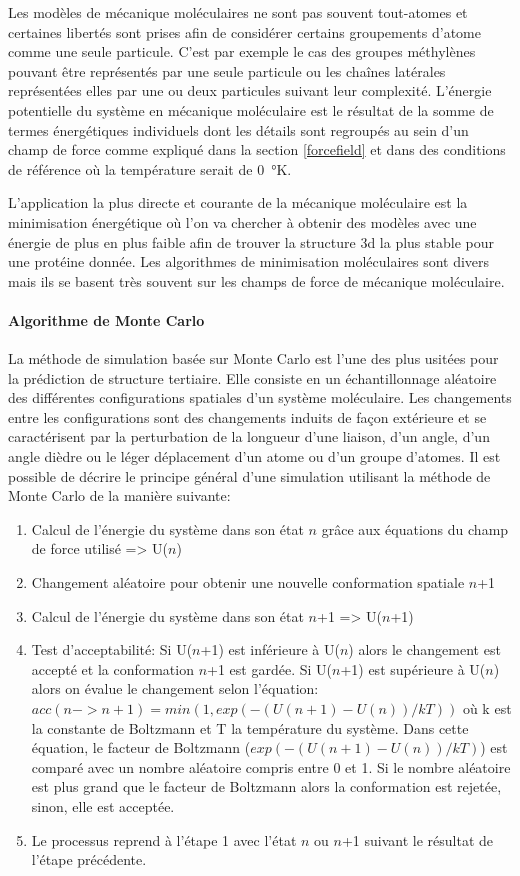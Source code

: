Les modèles de mécanique moléculaires ne sont pas souvent tout-atomes et certaines libertés sont prises afin de considérer certains groupements d'atome comme une seule particule. C'est par exemple le cas des groupes méthylènes pouvant être représentés par une seule particule ou les chaînes latérales représentées elles par une ou deux particules suivant leur complexité. L'énergie potentielle du système en mécanique moléculaire est le résultat de la somme de termes énergétiques individuels dont les détails sont regroupés au sein d'un champ de force comme expliqué dans la section \ref{forcefield} et dans des conditions de référence où la température serait de \SI{0}{\degree}K.

L'application la plus directe et courante de la mécanique moléculaire est la minimisation énergétique où l'on va chercher à obtenir des modèles avec une énergie de plus en plus faible afin de trouver la structure 3d la plus stable pour une protéine donnée. Les algorithmes de minimisation moléculaires sont divers mais ils se basent très souvent sur les champs de force de mécanique moléculaire.


\paragraph{Algorithme de Monte Carlo}

La méthode de simulation basée sur Monte Carlo est l'une des plus usitées \cite{metropolis1949monte} pour la prédiction de structure tertiaire. Elle consiste en un échantillonnage aléatoire des différentes configurations spatiales d'un système moléculaire. Les changements entre les configurations sont des changements induits de façon extérieure et se caractérisent par la perturbation de la longueur d'une liaison, d'un angle, d'un angle dièdre ou le léger déplacement d'un atome ou d'un groupe d'atomes. Il est possible de décrire le principe général d'une simulation utilisant la méthode de Monte Carlo de la manière suivante:

\begin{enumerate}
	\item Calcul de l'énergie du système dans son état $n$ grâce aux équations du champ de force utilisé => U($n$)
	\item Changement aléatoire pour obtenir une nouvelle conformation spatiale $n$+1
	\item Calcul de l'énergie du système dans son état $n$+1 => U($n$+1)
	\item Test d'acceptabilité: 
	Si U($n$+1) est inférieure à U($n$) alors le changement est accepté et la conformation $n$+1 est gardée. 
	Si U($n$+1) est supérieure à U($n$) alors on évalue le changement selon l'équation: $acc(n -> n+1) = min(1, exp(-(U(n+1)-U(n))/kT))$ où k est la constante de Boltzmann et T la température du système. Dans cette équation, le facteur de Boltzmann ($exp(-(U(n+1)-U(n))/kT)$) est comparé avec un nombre aléatoire compris entre 0 et 1. Si le nombre aléatoire est plus grand que le facteur de Boltzmann alors la conformation est rejetée, sinon, elle est acceptée.
	\item Le processus reprend à l'étape 1 avec l'état $n$ ou $n$+1 suivant le résultat de l'étape précédente.
\end{enumerate}

